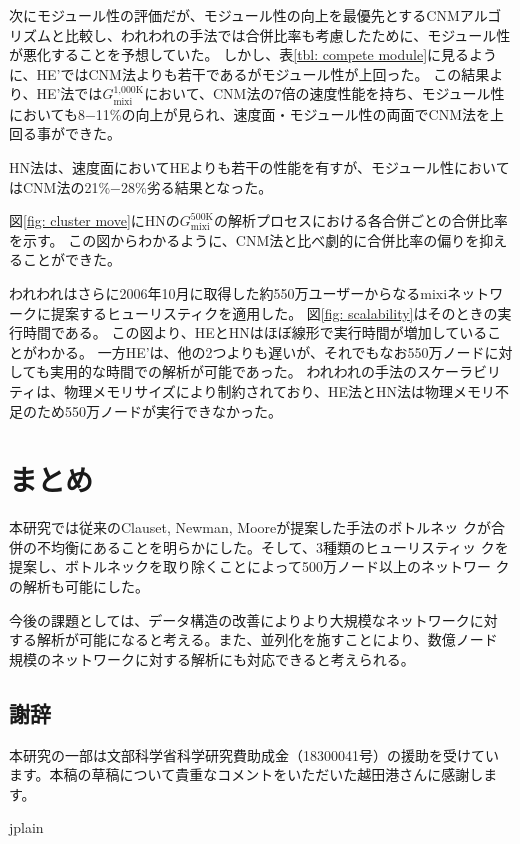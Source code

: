 \documentclass [a4j,11pt] {jsarticle}
\begin{document}
次にモジュール性の評価だが、モジュール性の向上を最優先とするCNMアルゴリズムと比較し、われわれの手法では合併比率も考慮したために、モジュール性が悪化することを予想していた。
しかし、表\ref{tbl: compete module}に見るように、HE'ではCNM法よりも若干であるがモジュール性が上回った。
この結果より、HE'法では$G_{\text{mixi}}^{\text{1,000K}}$において、CNM法の7倍の速度性能を持ち、モジュール性においても8−11\%の向上が見られ、速度面・モジュール性の両面でCNM法を上回る事ができた。

HN法は、速度面においてHEよりも若干の性能を有すが、モジュール性においてはCNM法の21\%−28\%劣る結果となった。

図\ref{fig: cluster move}にHNの$G_{\text{mixi}}^{\text{500K}}$の解析プロセスにおける各合併ごとの合併比率を示す。
この図からわかるように、CNM法と比べ劇的に合併比率の偏りを抑えることができた。

われわれはさらに2006年10月に取得した約550万ユーザーからなるmixiネットワークに提案するヒューリスティクを適用した。
図\ref{fig: scalability}はそのときの実行時間である。
この図より、HEとHNはほぼ線形で実行時間が増加していることがわかる。
一方HE'は、他の2つよりも遅いが、それでもなお550万ノードに対しても実用的な時間での解析が可能であった。
われわれの手法のスケーラビリティは、物理メモリサイズにより制約されており、HE法とHN法は物理メモリ不足のため550万ノードが実行できなかった。


\section {まとめ}
\label {sect: summary}

本研究では従来のClauset, Newman, Mooreが提案した手法のボトルネッ
クが合併の不均衡にあることを明らかにした。そして、3種類のヒューリスティッ
クを提案し、ボトルネックを取り除くことによって500万ノード以上のネットワー
クの解析も可能にした。

今後の課題としては、データ構造の改善によりより大規模なネットワークに対
する解析が可能になると考える。また、並列化を施すことにより、数億ノード
規模のネットワークに対する解析にも対応できると考えられる。

\subsection*{謝辞}

本研究の一部は文部科学省科学研究費助成金（18300041号）の援助を受けてい
ます。本稿の草稿について貴重なコメントをいただいた越田港さんに感謝しま
す。


 {jplain} %
\end{document}
